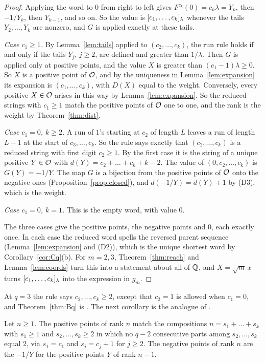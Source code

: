 \begin{proof}
Applying the word to $0$ from right to left gives $F^{c_k}(0)=c_k\lambda=Y_k$, then $-1/Y_k$, then
$Y_{k-1}$, and so on. So the value is $[c_1,\dots,c_k]_{\lambda}$ whenever the tails $Y_2,\dots,Y_k$ are
nonzero, and $G$ is applied exactly at these tails.

\emph{Case $c_1\ge1$.} By Lemma~\ref{lem:tails} applied to $(c_2,\dots,c_k)$, the run rule holds if and
only if the tails $Y_j$, $j\ge2$, are defined and greater than $1/\lambda$. Then $G$ is applied only at
positive points, and the value $X$ is greater than $(c_1-1)\lambda\ge0$. So $X$ is a positive point of
$\mathcal{O}$, and by the uniqueness in Lemma~\ref{lem:expansion} its expansion is $(c_1,\dots,c_k)$, with
$D(X)$ equal to the weight. Conversely, every positive $X\in\mathcal{O}$ arises in this way by
Lemma~\ref{lem:expansion}. So the reduced strings with $c_1\ge1$ match the positive points of $\mathcal{O}$
one to one, and the rank is the weight by Theorem~\ref{thm:dist}.

\emph{Case $c_1=0$, $k\ge2$.} A run of $1$'s starting at $c_2$ of length $L$ leaves a run of length
$L-1$ at the start of $c_3,\dots,c_k$. So the rule says exactly that $(c_2,\dots,c_k)$ is a reduced
string with first digit $c_2\ge1$. By the first case it is the string of a unique positive $Y\in\mathcal{O}$
with $d(Y)=c_2+\dots+c_k+k-2$. The value of $(0,c_2,\dots,c_k)$ is $G(Y)=-1/Y$. The map $G$ is a
bijection from the positive points of $\mathcal{O}$ onto the negative ones (Proposition~\ref{prop:closed}),
and $d(-1/Y)=d(Y)+1$ by (D3), which is the weight.

\emph{Case $c_1=0$, $k=1$.} This is the empty word, with value $0$.

The three cases give the positive points, the negative points and $0$, each exactly once. In each
case the reduced word spells the reversed parent sequence (Lemma~\ref{lem:expansion} and (D2)), which
is the unique shortest word by Corollary~\ref{cor:Cq}(b). For $m=2,3$, Theorem~\ref{thm:reach} and
Lemma~\ref{lem:coords} turn this into a statement about all of $\mathbb{Q}$, and $X=\sqrt m\,x$ turns
$[c_1,\dots,c_k]_{\lambda}$ into the expression in $g_m$.
\end{proof}

At $q=3$ the rule says $c_2,\dots,c_k\ge2$, except that $c_2=1$ is allowed when $c_1=0$, and
Theorem~\ref{thm:Bq} is \cite[Lemma~4.1 and Theorem~4.2]{P137}. The next corollary is the analogue of
\cite[Corollary~4.3]{P137}.

\begin{corollary}\label{cor:compositions}
Let $n\ge1$. The positive points of rank $n$ match the compositions $n=s_1+\dots+s_k$ with $s_1\ge1$
and $s_2,\dots,s_k\ge2$ in which no $q-2$ consecutive parts among $s_2,\dots,s_k$ equal $2$, via
$s_1=c_1$ and $s_j=c_j+1$ for $j\ge2$. The negative points of rank $n$ are the $-1/Y$ for the positive
points $Y$ of rank $n-1$.
\end{corollary}

